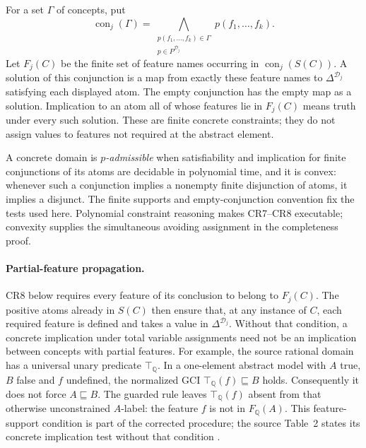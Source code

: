 For a set \(\Gamma\) of concepts, put
\[
 \operatorname{con}_j(\Gamma)=
 \bigwedge_{\substack{p(f_1,\ldots,f_k)\in\Gamma\\
                       p\in P^{\mathcal D_j}}}
 p(f_1,\ldots,f_k).
\]
Let \(F_j(C)\) be the finite set of feature names occurring in
\(\operatorname{con}_j(S(C))\).  A solution of this conjunction is a map
from exactly these feature names to \(\Delta^{\mathcal D_j}\) satisfying
each displayed atom.  The empty conjunction has the empty map as a solution.
Implication to an atom all of whose features lie in \(F_j(C)\) means truth
under every such solution.  These are finite concrete constraints; they do
not assign values to features not required at the abstract element.

A concrete domain is \emph{\(p\)-admissible} when satisfiability and
implication for finite conjunctions of its atoms are decidable in polynomial
time, and it is convex: whenever such a conjunction implies a nonempty finite
disjunction of atoms, it implies a disjunct.  The finite supports and
empty-conjunction convention fix the tests used here.  Polynomial constraint
reasoning makes CR7--CR8 executable; convexity supplies the simultaneous
avoiding assignment in the completeness proof.

\paragraph{Partial-feature propagation.}
\label{sec:p09-elpp-partial-features}
CR8 below requires every feature of its conclusion to belong to \(F_j(C)\).
The positive atoms already in \(S(C)\) then ensure that, at any instance of
\(C\), each required feature is defined and takes a value in
\(\Delta^{\mathcal D_j}\).  Without that condition, a concrete implication
under total variable assignments need not be an implication between concepts
with partial features.  For example, the source rational domain has a
universal unary predicate \(\top_{\mathbb Q}\).  In a one-element abstract
model with \(A\) true, \(B\) false and \(f\) undefined, the normalized GCI
\(\top_{\mathbb Q}(f)\sqsubseteq B\) holds.  Consequently it does not force
\(A\sqsubseteq B\).  The guarded rule leaves
\(\top_{\mathbb Q}(f)\) absent from that otherwise unconstrained \(A\)-label:
the feature \(f\) is not in \(F_{\mathbb Q}(A)\).
This feature-support condition is part of the corrected procedure; the source
Table~2 states its concrete implication test without that condition
\cite[table~1, table~2 and prop.~5]{BaaderBrandtLutz2005}.

